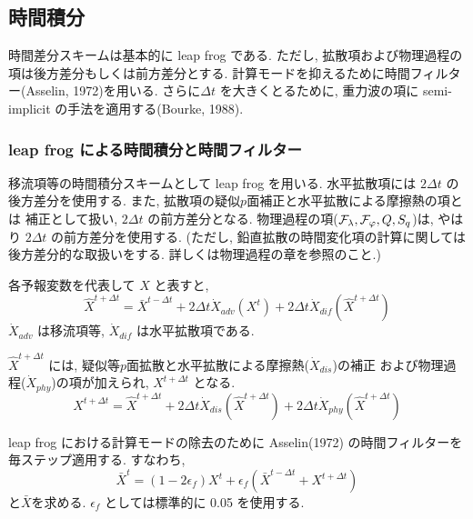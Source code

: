 ﻿\subsection{時間積分}

時間差分スキームは基本的に leap frog である.
ただし, 拡散項および物理過程の項は後方差分もしくは前方差分とする.
計算モードを抑えるために時間フィルター(Asselin, 1972)を用いる.
さらに$\Delta t$ を大きくとるために,
重力波の項に semi-implicit の手法を適用する(Bourke, 1988).

\subsubsection{leap frog による時間積分と時間フィルター}

移流項等の時間積分スキームとして leap frog を用いる.
水平拡散項には $2 \Delta t$ の後方差分を使用する.
また, 拡散項の疑似$p$面補正と水平拡散による摩擦熱の項とは
補正として扱い, $2 \Delta t$ の前方差分となる.
物理過程の項(${\cal F}_\lambda, {\cal F}_\varphi, Q, S_q$)は,
やはり $2 \Delta t$ の前方差分を使用する.
(ただし, 鉛直拡散の時間変化項の計算に関しては後方差分的な取扱いをする.
詳しくは物理過程の章を参照のこと.)

各予報変数を代表して ${X}$ と表すと,
%
\begin{equation}
  \hat{X}^{t+\Delta t} 
    =  \bar{X}^{t-\Delta t}
    + 2 \Delta t 
      \dot{X}_{adv}\left( {X}^{t} \right)
    + 2 \Delta t 
      \dot{X}_{dif}\left( \hat{X}^{t+\Delta t} \right)
\end{equation}
%
$ \dot{X}_{adv} $ は移流項等,
$ \dot{X}_{dif} $ は水平拡散項である.

$ \hat{X}^{t+\Delta t} $ には, 
疑似等$p$面拡散と水平拡散による摩擦熱($ \dot{X}_{dis} $)の補正
および物理過程($ \dot{X}_{phy} $)の項が加えられ,
$ {X}^{t+\Delta t} $ となる.
%
\begin{equation}
  {X}^{t+\Delta t} 
    =  \hat{X}^{t+\Delta t}
    + 2 \Delta t 
      \dot{X}_{dis}\left( \hat{X}^{t+\Delta t} \right)
    + 2 \Delta t 
      \dot{X}_{phy}\left( \hat{X}^{t+\Delta t} \right)
\end{equation}

leap frog における計算モードの除去のために 
Asselin(1972) の時間フィルターを毎ステップ適用する.
すなわち, 
%
\begin{equation}
  \bar{X}^{t}
    = ( 1-2 \epsilon_f ) {X}^{t}
    +  \epsilon_f 
        \left( \bar{X}^{t-\Delta t} + {X}^{t+\Delta t} \right)
\end{equation}
%
と$\bar{X}$を求める.
$\epsilon_f$ としては標準的に 0.05 を使用する. 

